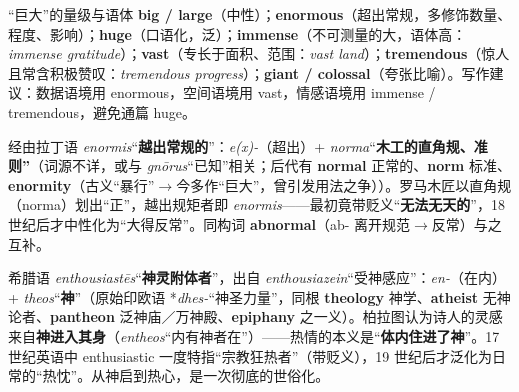 \documentclass[../main.tex]{subfiles}
\begin{document}
\begin{gram}{“巨大”的量级与语体}
\textbf{big / large}（中性）；\textbf{enormous}（超出常规，多修饰数量、程度、影响）；\textbf{huge}（口语化，泛）；\textbf{immense}（不可测量的大，语体高：\textit{immense gratitude}）；\textbf{vast}（专长于面积、范围：\textit{vast land}）；\textbf{tremendous}（惊人且常含积极赞叹：\textit{tremendous progress}）；\textbf{giant / colossal}（夸张比喻）。写作建议：数据语境用 enormous，空间语境用 vast，情感语境用 immense / tremendous，避免通篇 huge。
\end{gram}

\begin{origin}
经由拉丁语 \textit{enormis}“\textbf{越出常规的}”：\textit{e(x)-}（超出）+ \textit{norma}“\textbf{木工的直角规、准则”}（词源不详，或与 \textit{gnōrus}“已知”相关；后代有 \textbf{normal} 正常的、\textbf{norm} 标准、\textbf{enormity}（古义“暴行”$\to$今多作“巨大”，曾引发用法之争））。罗马木匠以直角规（norma）划出“正”，越出规矩者即 \textit{enormis}——最初竟带贬义“\textbf{无法无天的}”，18 世纪后才中性化为“大得反常”。同构词 \textbf{abnormal}（ab- 离开规范$\to$反常）与之互补。
\end{origin}



\begin{origin}
希腊语 \textit{enthousiastēs}“\textbf{神灵附体者}”，出自 \textit{enthousiazein}“受神感应”：\textit{en-}（在内）+ \textit{theos}“\textbf{神}”（原始印欧语 *\textit{dhes-}“神圣力量”，同根 \textbf{theology} 神学、\textbf{atheist} 无神论者、\textbf{pantheon} 泛神庙／万神殿、\textbf{epiphany} 之一义）。柏拉图认为诗人的灵感来自\textbf{神进入其身}（\textit{entheos}“内有神者在”）——热情的本义是“\textbf{体内住进了神}”。17 世纪英语中 enthusiastic 一度特指“宗教狂热者”（带贬义），19 世纪后才泛化为日常的“热忱”。从神启到热心，是一次彻底的世俗化。
\end{origin}


\end{document}
